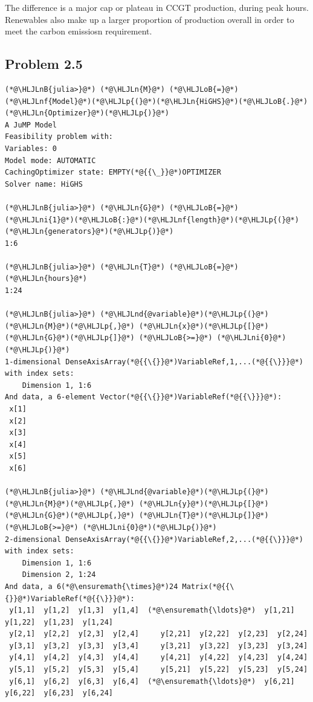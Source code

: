 \documentclass[12pt,a4paper]{article}
\newcommand{\HLJLn}[1]{#1}
\newcommand{\HLJLnd}[1]{\textcolor[RGB]{214,102,97}{#1}}
\newcommand{\HLJLnf}[1]{\textcolor[RGB]{66,102,213}{#1}}
\newcommand{\HLJLnB}[1]{\textcolor[RGB]{59,151,46}{#1}}
\newcommand{\HLJLni}[1]{\textcolor[RGB]{59,151,46}{#1}}
\newcommand{\HLJLoB}[1]{\textcolor[RGB]{102,102,102}{\textbf{#1}}}
\newcommand{\HLJLp}[1]{#1}
\begin{document}
The difference is a major cap or plateau in CCGT production, during peak hours. Renewables also make up a larger proportion of production overall in order to meet the carbon emissiosn requirement. 

\subsection{Problem 2.5}

\begin{lstlisting}
(*@\HLJLnB{julia>}@*) (*@\HLJLn{M}@*) (*@\HLJLoB{=}@*) (*@\HLJLnf{Model}@*)(*@\HLJLp{(}@*)(*@\HLJLn{HiGHS}@*)(*@\HLJLoB{.}@*)(*@\HLJLn{Optimizer}@*)(*@\HLJLp{)}@*)
A JuMP Model
Feasibility problem with:
Variables: 0
Model mode: AUTOMATIC
CachingOptimizer state: EMPTY(*@{{\_}}@*)OPTIMIZER
Solver name: HiGHS

(*@\HLJLnB{julia>}@*) (*@\HLJLn{G}@*) (*@\HLJLoB{=}@*) (*@\HLJLni{1}@*)(*@\HLJLoB{:}@*)(*@\HLJLnf{length}@*)(*@\HLJLp{(}@*)(*@\HLJLn{generators}@*)(*@\HLJLp{)}@*)
1:6

(*@\HLJLnB{julia>}@*) (*@\HLJLn{T}@*) (*@\HLJLoB{=}@*) (*@\HLJLn{hours}@*)
1:24

(*@\HLJLnB{julia>}@*) (*@\HLJLnd{@variable}@*)(*@\HLJLp{(}@*)(*@\HLJLn{M}@*)(*@\HLJLp{,}@*) (*@\HLJLn{x}@*)(*@\HLJLp{[}@*)(*@\HLJLn{G}@*)(*@\HLJLp{]}@*) (*@\HLJLoB{>=}@*) (*@\HLJLni{0}@*)(*@\HLJLp{)}@*)
1-dimensional DenseAxisArray(*@{{\{}}@*)VariableRef,1,...(*@{{\}}}@*) with index sets:
    Dimension 1, 1:6
And data, a 6-element Vector(*@{{\{}}@*)VariableRef(*@{{\}}}@*):
 x[1]
 x[2]
 x[3]
 x[4]
 x[5]
 x[6]

(*@\HLJLnB{julia>}@*) (*@\HLJLnd{@variable}@*)(*@\HLJLp{(}@*)(*@\HLJLn{M}@*)(*@\HLJLp{,}@*) (*@\HLJLn{y}@*)(*@\HLJLp{[}@*)(*@\HLJLn{G}@*)(*@\HLJLp{,}@*) (*@\HLJLn{T}@*)(*@\HLJLp{]}@*) (*@\HLJLoB{>=}@*) (*@\HLJLni{0}@*)(*@\HLJLp{)}@*)
2-dimensional DenseAxisArray(*@{{\{}}@*)VariableRef,2,...(*@{{\}}}@*) with index sets:
    Dimension 1, 1:6
    Dimension 2, 1:24
And data, a 6(*@\ensuremath{\times}@*)24 Matrix(*@{{\{}}@*)VariableRef(*@{{\}}}@*):
 y[1,1]  y[1,2]  y[1,3]  y[1,4]  (*@\ensuremath{\ldots}@*)  y[1,21]  y[1,22]  y[1,23]  y[1,24]
 y[2,1]  y[2,2]  y[2,3]  y[2,4]     y[2,21]  y[2,22]  y[2,23]  y[2,24]
 y[3,1]  y[3,2]  y[3,3]  y[3,4]     y[3,21]  y[3,22]  y[3,23]  y[3,24]
 y[4,1]  y[4,2]  y[4,3]  y[4,4]     y[4,21]  y[4,22]  y[4,23]  y[4,24]
 y[5,1]  y[5,2]  y[5,3]  y[5,4]     y[5,21]  y[5,22]  y[5,23]  y[5,24]
 y[6,1]  y[6,2]  y[6,3]  y[6,4]  (*@\ensuremath{\ldots}@*)  y[6,21]  y[6,22]  y[6,23]  y[6,24]


\end{lstlisting}
\end{document}
